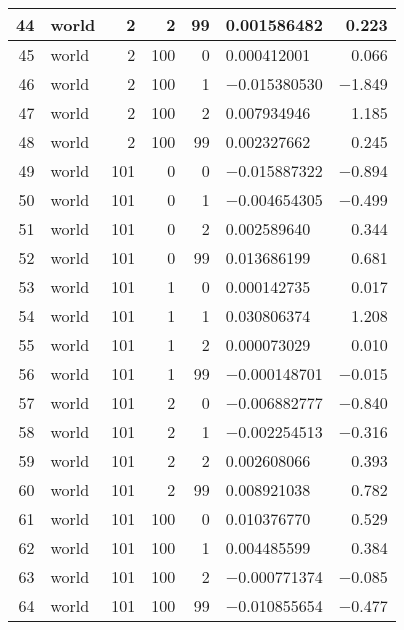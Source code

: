 \begin{longtable}{|r|l|r|r|r|l|r|}
   44 &    world &    2 &    2 &    99 &    0.001586482 &    0.223\\\hline
   45 &    world &    2 &    100 &    0 &    0.000412001 &    0.066\\\hline
   46 &    world &    2 &    100 &    1 &    $-$0.015380530 &    $-$1.849\\\hline
   47 &    world &    2 &    100 &    2 &    0.007934946 &    1.185\\\hline
   48 &    world &    2 &    100 &    99 &    0.002327662 &    0.245\\\hline
   49 &    world &    101 &    0 &    0 &    $-$0.015887322 &    $-$0.894\\\hline
   50 &    world &    101 &    0 &    1 &    $-$0.004654305 &    $-$0.499\\\hline
   51 &    world &    101 &    0 &    2 &    0.002589640 &    0.344\\\hline
   52 &    world &    101 &    0 &    99 &    0.013686199 &    0.681\\\hline
   53 &    world &    101 &    1 &    0 &    0.000142735 &    0.017\\\hline
   54 &    world &    101 &    1 &    1 &    0.030806374 &    1.208\\\hline
   55 &    world &    101 &    1 &    2 &    0.000073029 &    0.010\\\hline
   56 &    world &    101 &    1 &    99 &    $-$0.000148701 &    $-$0.015\\\hline
   57 &    world &    101 &    2 &    0 &    $-$0.006882777 &    $-$0.840\\\hline
   58 &    world &    101 &    2 &    1 &    $-$0.002254513 &    $-$0.316\\\hline
   59 &    world &    101 &    2 &    2 &    0.002608066 &    0.393\\\hline
   60 &    world &    101 &    2 &    99 &    0.008921038 &    0.782\\\hline
   61 &    world &    101 &    100 &    0 &    0.010376770 &    0.529\\\hline
   62 &    world &    101 &    100 &    1 &    0.004485599 &    0.384\\\hline
   63 &    world &    101 &    100 &    2 &    $-$0.000771374 &    $-$0.085\\\hline
   64 &    world &    101 &    100 &    99 &    $-$0.010855654 &    $-$0.477\\\hline
\end{longtable}

